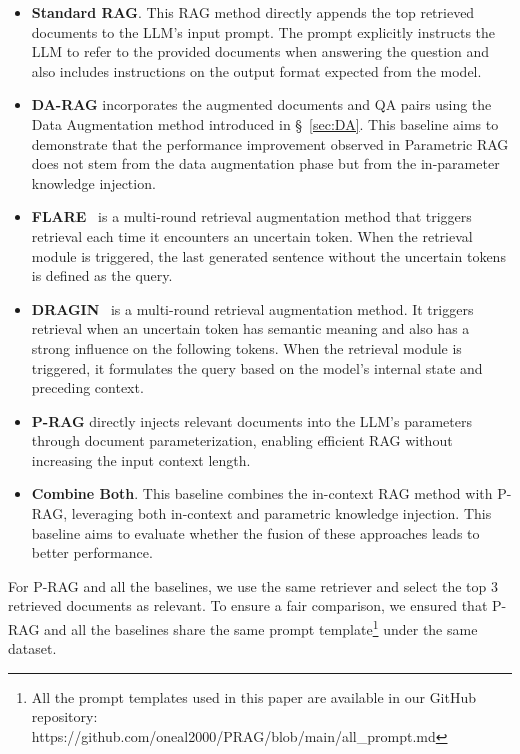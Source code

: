\documentclass[sigconf,natbib=true,anonymous=false]{acmart}
\begin{document}
\begin{itemize}[leftmargin=*]

\item \textbf{Standard RAG}. 
This RAG method directly appends the top retrieved documents to the LLM’s input prompt. The prompt explicitly instructs the LLM to refer to the provided documents when answering the question and also includes instructions on the output format expected from the model.




\item \textbf{DA-RAG} incorporates the augmented documents and QA pairs using the Data Augmentation method introduced in \S ~\ref{sec:DA}. 
This baseline aims to demonstrate that the performance improvement observed in Parametric RAG does not stem from the data augmentation phase but from the in-parameter knowledge injection.



\item \textbf{FLARE}~\cite{jiang2023active} is a multi-round retrieval augmentation method that triggers retrieval each time it encounters an uncertain token. When the retrieval module is triggered, the last generated sentence without the uncertain tokens is defined as the query.

\item \textbf{DRAGIN}~\cite{su2024dragin} is a multi-round retrieval augmentation method. It triggers retrieval when an uncertain token has semantic meaning and also has a strong influence on the following tokens. When the retrieval module is triggered, it formulates the query based on the model’s internal state and preceding context.

\item \textbf{P-RAG} directly injects relevant documents into the LLM’s parameters through document parameterization, enabling efficient RAG without increasing the input context length.


\item \textbf{Combine Both}. This baseline combines the in-context RAG method with P-RAG, leveraging both in-context and parametric knowledge injection. 
This baseline aims to evaluate whether the fusion of these approaches leads to better performance.



\end{itemize}


For P-RAG and all the baselines, we use the same retriever and select the top $3$ retrieved documents as relevant.
To ensure a fair comparison, we ensured that P-RAG and all the baselines share the same prompt template\footnote{All the prompt templates used in this paper are available in our GitHub repository: https://github.com/oneal2000/PRAG/blob/main/all\_prompt.md} under the same dataset.
\end{document}

